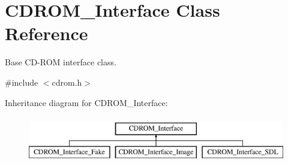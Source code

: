 \hypertarget{classCDROM__Interface}{\section{C\-D\-R\-O\-M\-\_\-\-Interface Class Reference}
\label{classCDROM__Interface}
}


Base C\-D-\/\-R\-O\-M interface class.  




{\ttfamily \#include $<$cdrom.\-h$>$}

Inheritance diagram for C\-D\-R\-O\-M\-\_\-\-Interface\-:\begin{figure}[H]
\begin{center}
\leavevmode
\includegraphics[height=2.000000cm]{classCDROM__Interface}
\end{center}
\end{figure}
